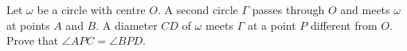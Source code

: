 Let $\omega$ be a circle with centre $O$. A second circle $\Gamma$ passes through $O$ and meets $\omega$ at points $A$ and $B$. A diameter $CD$ of $\omega$ meets $\Gamma$ at a point $P$ different from $O$. Prove that $\angle APC=\angle BPD$.
